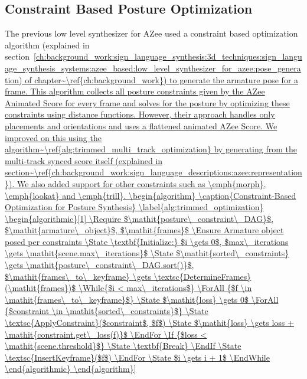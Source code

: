 \documentclass[../../main.tex]{subfiles}
\begin{document}
\subsection{Constraint Based Posture Optimization}
\label{ch:avatar_creation_pose_synthesis:proc_rig_signing_avatars:cb_posegen}

The previous low level synthesizer for AZee used a constraint based optimization algorithm (explained in section~\ref{ch:background_work:sign_language_synthesis:3d_techniques:sign_language_synthesis_systems:azee_based:low_level_synthesizer_for_azee:pose_generation) of chapter~\ref{ch:background_work}) to generate the armature pose for a frame. This algorithm collects all posture constraints given by the AZee Animated Score for every frame and solves for the posture by optimizing these constraints using distance functions. 

However, their approach handles only placements and orientations and uses a flattened animated AZee Score. We improved on this using the algorithm~\ref{alg:trimmed_multi_track_optimization} by generating from the multi-track synced score itself (explained in section~\ref{ch:background_work:sign_language_descriptions:azee:representation}). We also added support for other constraints such as \emph{morph}, \emph{lookat} and \emph{trill}.

\begin{algorithm}
    \caption{Constraint-Based Optimization for Posture Synthesis}
    \label{alg:trimmed_optimization}
    \begin{algorithmic}[1]
        \Require $\mathit{posture\_constraint\_DAG}$, $\mathit{armature\_object}$, $\mathit{frames}$
        \Ensure Armature object posed per constraints
        
        \State \textbf{Initialize:} $i \gets 0$, $max\_iterations \gets \mathit{scene.max\_iterations}$
        \State $\mathit{sorted\_constraints} \gets \mathit{posture\_constraint\_DAG.sort()}$, $\mathit{frames\_to\_keyframe} \gets \textsc{DetermineFrames}(\mathit{frames})$
        
        \While{$i < max\_iterations$}
            \ForAll {$f \in \mathit{frames\_to\_keyframe}$}
                \State $\mathit{loss} \gets 0$
                \ForAll {$constraint \in \mathit{sorted\_constraints}$}
                    \State \textsc{ApplyConstraint}($constraint$, $f$)
                    \State $\mathit{loss} \gets loss + \mathit{constraint.get\_loss(f)}$
                \EndFor
                \If {$loss < \mathit{scene.threshold}$}
                    \State \textbf{Break}
                \EndIf
                \State \textsc{InsertKeyframe}($f$)
            \EndFor
            \State $i \gets i + 1$
        \EndWhile
        

\end{algorithmic}
\end{algorithm}}
\end{document}
